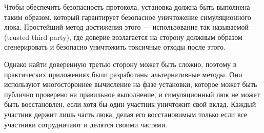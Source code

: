Чтобы обеспечить безопасность протокола, установка должна быть выполнена таким образом, который гарантирует безопасное уничтожение симуляционного люка. Простейший метод достижения этого --- использование так называемой  (trusted third party), где доверие возлагается на сторону должным образом сгенерировать  и безопасно уничтожить токсичные отходы после этого.

Однако найти доверенную третью сторону может быть сложно, поэтому в практических приложениях были разработаны альтернативные методы. Они используют многостороннее вычисление на фазе установки, которое может быть публично проверено на правильное выполнение, и симуляционный люк не может быть восстановлен, если хотя бы один участник уничтожит свой вклад. Каждый участник держит лишь часть люка, делая его восстановимым только если все участники сотрудничают и делятся своими частями.

